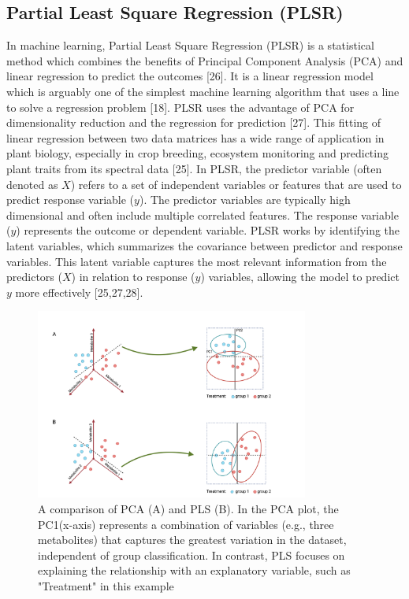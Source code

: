 \documentclass[12pt,a4paper]{report}
\begin{document}
\subsection{Partial Least Square Regression (PLSR)}
In machine learning, Partial Least Square Regression (PLSR) is a statistical method which combines the benefits of Principal Component Analysis (PCA) and linear regression to predict the outcomes [26]. It is a linear regression model which is arguably one of the simplest machine learning algorithm that uses a line to solve a regression problem [18]. PLSR uses the advantage of PCA for dimensionality reduction and the regression for prediction [27].
This fitting of linear regression between two data matrices has a wide range of application in plant biology, especially in crop breeding, ecosystem monitoring and predicting plant traits from its spectral data [25]. In PLSR, the predictor variable (often denoted as $X$) refers to a set of independent 
variables or features that are used to predict response variable ($y$). The predictor variables are typically high dimensional and often include multiple correlated features. The response variable ($y$) represents the outcome or dependent variable. PLSR works by identifying the latent variables, which 
summarizes the covariance between predictor and response variables. This latent variable captures the most relevant information from the predictors ($X$) in relation to response ($y$) variables, allowing the model to predict $y$ more effectively [25,27,28]. \\

\begin{figure}[h]
    \centering
    \includegraphics[width=0.8\textwidth]{Figures/PLSR.png}
    \caption{A comparison of PCA (A) and PLS (B). In the PCA plot, the PC1(x-axis) represents a combination of variables (e.g., three metabolites) that captures the greatest variation in the dataset, independent of group classification. In contrast, PLS focuses on explaining the relationship with an explanatory variable, such as "Treatment" in this example}
    \label{fig:plsr}
\end{figure}
\end{document}
